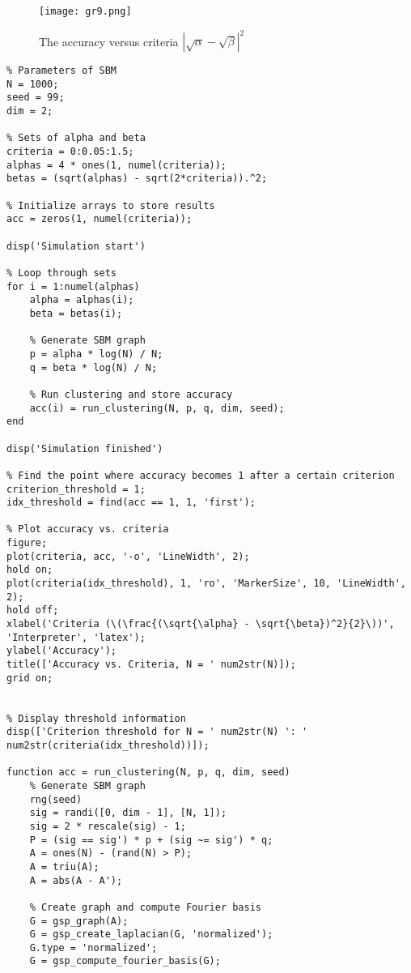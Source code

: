 \documentclass{article}
\begin{document}
    \begin{figure}[h!]
        \centering
        \texttt{[image: gr9.png]} %
        \caption{The accuracy versus criteria $|\sqrt{\alpha}-\sqrt{\beta}|^2$}
        \label{fig:gr9}
    \end{figure} 




\begin{lstlisting}
% Parameters of SBM
N = 1000;
seed = 99;
dim = 2;

% Sets of alpha and beta
criteria = 0:0.05:1.5;
alphas = 4 * ones(1, numel(criteria));
betas = (sqrt(alphas) - sqrt(2*criteria)).^2;

% Initialize arrays to store results
acc = zeros(1, numel(criteria));

disp('Simulation start')

% Loop through sets
for i = 1:numel(alphas)
    alpha = alphas(i);
    beta = betas(i);
    
    % Generate SBM graph
    p = alpha * log(N) / N;
    q = beta * log(N) / N;

    % Run clustering and store accuracy
    acc(i) = run_clustering(N, p, q, dim, seed);
end

disp('Simulation finished')

% Find the point where accuracy becomes 1 after a certain criterion
criterion_threshold = 1;
idx_threshold = find(acc == 1, 1, 'first');

% Plot accuracy vs. criteria
figure;
plot(criteria, acc, '-o', 'LineWidth', 2);
hold on;
plot(criteria(idx_threshold), 1, 'ro', 'MarkerSize', 10, 'LineWidth', 2);
hold off;
xlabel('Criteria (\(\frac{(\sqrt{\alpha} - \sqrt{\beta})^2}{2}\))', 'Interpreter', 'latex');
ylabel('Accuracy');
title(['Accuracy vs. Criteria, N = ' num2str(N)]);
grid on;


% Display threshold information
disp(['Criterion threshold for N = ' num2str(N) ': ' num2str(criteria(idx_threshold))]);

function acc = run_clustering(N, p, q, dim, seed)
    % Generate SBM graph
    rng(seed)
    sig = randi([0, dim - 1], [N, 1]);
    sig = 2 * rescale(sig) - 1;
    P = (sig == sig') * p + (sig ~= sig') * q;
    A = ones(N) - (rand(N) > P);
    A = triu(A);
    A = abs(A - A');

    % Create graph and compute Fourier basis
    G = gsp_graph(A);
    G = gsp_create_laplacian(G, 'normalized');
    G.type = 'normalized';
    G = gsp_compute_fourier_basis(G);


\end{lstlisting}
\end{document}
